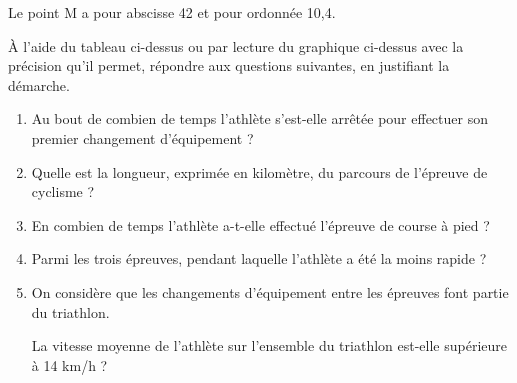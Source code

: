 Le point M a pour abscisse 42 et pour ordonnée 10,4.
	
À l'aide du tableau ci-dessus ou par lecture du graphique ci-dessus avec la précision qu'il permet, répondre aux questions suivantes, en justifiant la démarche.

\medskip
	
	\begin{enumerate}
		\item Au bout de combien de temps l'athlète s'est-elle arrêtée pour effectuer son premier changement d'équipement ?
		
		\item Quelle est la longueur, exprimée en kilomètre, du parcours de l'épreuve de cyclisme ?
		
		\item En combien de temps l'athlète a-t-elle effectué l'épreuve de course à pied ?
		
		\item Parmi les trois épreuves, pendant laquelle l'athlète a été la moins rapide ?
		
		\item On considère que les changements d'équipement entre les épreuves font partie du triathlon.
		
		La vitesse moyenne de l'athlète sur l'ensemble du triathlon est-elle supérieure à 14 km/h ?
	\end{enumerate}
	
	

